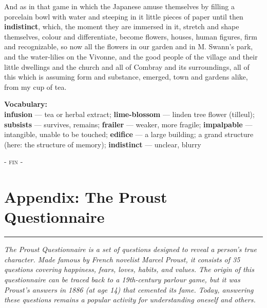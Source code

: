 \documentclass[11pt, a4paper]{article}
\begin{document}
And as in that game in which the Japanese amuse themselves by filling a porcelain bowl with water and steeping in it little pieces of paper until then \textbf{indistinct}, which, the moment they are immersed in it, stretch and shape themselves, colour and differentiate, become flowers, houses, human figures, firm and recognizable, so now all the flowers in our garden and in M. Swann’s park, and the water-lilies on the Vivonne, and the good people of the village and their little dwellings and the church and all of Combray and its surroundings, all of this which is assuming form and substance, emerged, town and gardens alike, from my cup of tea.

\medskip
\noindent\textbf{Vocabulary:}\\
\textbf{infusion} — tea or herbal extract; \textbf{lime-blossom} — linden tree flower (tilleul); \textbf{subsists} — survives, remains; \textbf{frailer} — weaker, more fragile; \textbf{impalpable} — intangible, unable to be touched; \textbf{edifice} — a large building; a grand structure (here: the structure of memory); \textbf{indistinct} — unclear, blurry

\begin{center}
    \small \textsc{- fin -}
\end{center}

\newpage
\thispagestyle{empty}
\nolinenumbers
{}

\vspace*{0.3em}
\section*{Appendix: The Proust Questionnaire}

\noindent\rule{\linewidth}{0.5pt}

\vspace{0.3em}
\noindent\textit{The Proust Questionnaire is a set of questions designed to reveal a person's true character. Made famous by French novelist Marcel Proust, it consists of 35 questions covering happiness, fears, loves, habits, and values. The origin of this questionnaire can be traced back to a 19th-century parlour game, but it was Proust's answers in 1886 (at age 14) that cemented its fame. Today, answering these questions remains a popular activity for understanding oneself and others.}
\end{document}
